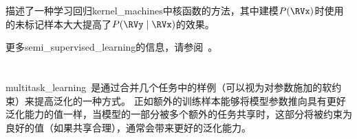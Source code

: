 \cite{Salakhutdinov-Hinton-2008}描述了一种学习回归\gls{kernel_machines}中核函数的方法，其中建模$P(\RVx)$时使用的未标记样本大大提高了$P(\RVy \mid \RVx)$的效果。

更多\gls{semi_supervised_learning}的信息，请参阅~\cite{Chapelle-et-al-2006}。

\section{}
\label{sec:multitask_learning}
\gls{multitask_learning}~\citep{Caruana-1993}是通过合并几个任务中的样例（可以视为对参数施加的软约束）来提高泛化的一种方式。
正如额外的训练样本能够将模型参数推向具有更好泛化能力的值一样，当模型的一部分被多个额外的任务共享时，这部分将被约束为良好的值（如果共享合理），通常会带来更好的泛化能力。


